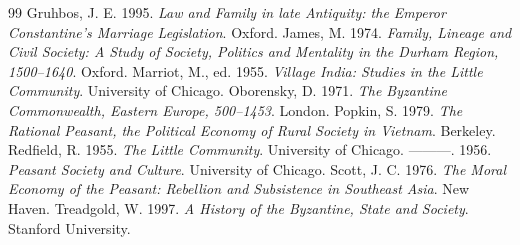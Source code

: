 \documentclass[a4paper,12pt,punct=kaiming]{ctexart}
\begin{document}
\begin{thebibliography}{99}
 Gruhbos, J. E. 1995. \textit{Law and Family in late Antiquity: the Emperor Constantine’s Marriage Legislation}. Oxford.
 James, M. 1974. \textit{Family, Lineage and Civil Society: A Study of Society, Politics and Mentality in the Durham Region, 1500–1640}. Oxford.
 Marriot, M., ed. 1955. \textit{Village India: Studies in the Little Community}. University of Chicago.
 Oborensky, D. 1971. \textit{The Byzantine Commonwealth, Eastern Europe, 500–1453}. London.
 Popkin, S. 1979. \textit{The Rational Peasant, the Political Economy of Rural Society in Vietnam}. Berkeley.
 Redfield, R. 1955. \textit{The Little Community}. University of Chicago.
 ———. 1956. \textit{Peasant Society and Culture}. University of Chicago.
 Scott, J. C. 1976. \textit{The Moral Economy of the Peasant: Rebellion and Subsistence in Southeast Asia}. New Haven.
 Treadgold, W. 1997. \textit{A History of the Byzantine, State and Society}. Stanford University.
\end{thebibliography}
\end{document}
